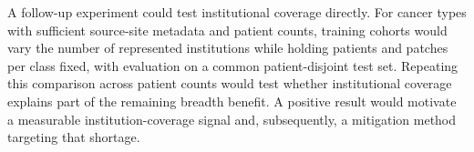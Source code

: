 A follow-up experiment could test institutional coverage directly. For cancer types with sufficient source-site metadata and patient counts, training cohorts would vary the number of represented institutions while holding patients and patches per class fixed, with evaluation on a common patient-disjoint test set. Repeating this comparison across patient counts would test whether institutional coverage explains part of the remaining breadth benefit. A positive result would motivate a measurable institution-coverage signal and, subsequently, a mitigation method targeting that shortage.

